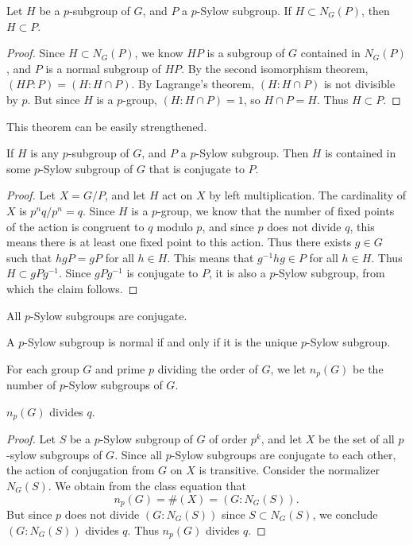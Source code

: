 \begin{lemma}
    Let $H$ be a $p$-subgroup of $G$, and $P$ a $p$-Sylow subgroup. If $H \subset N_G(P)$, then $H \subset P$.
\end{lemma}
\begin{proof}
    Since $H \subset N_G(P)$, we know $HP$ is a subgroup of $G$ contained in $N_G(P)$, and $P$ is a normal subgroup of $HP$. By the second isomorphism theorem, $(HP:P) = (H: H \cap P)$. By Lagrange's theorem, $(H: H \cap P)$ is not divisible by $p$. But since $H$ is a $p$-group, $(H: H \cap P) = 1$, so $H \cap P = H$. Thus $H \subset P$.
\end{proof}

This theorem can be easily strengthened.

\begin{theorem}
    If $H$ is any $p$-subgroup of $G$, and $P$ a $p$-Sylow subgroup. Then $H$ is contained in some $p$-Sylow subgroup of $G$ that is conjugate to $P$.
\end{theorem}
\begin{proof}
    Let $X = G/P$, and let $H$ act on $X$ by left multiplication. The cardinality of $X$ is $p^n q / p^n = q$. Since $H$ is a $p$-group, we know that the number of fixed points of the action is congruent to $q$ modulo $p$, and since $p$ does not divide $q$, this means there is at least one fixed point to this action. Thus there exists $g \in G$ such that $hgP = gP$ for all $h \in H$. This means that $g^{-1}hg \in P$ for all $h \in H$. Thus $H \subset gPg^{-1}$. Since $gPg^{-1}$ is conjugate to $P$, it is also a $p$-Sylow subgroup, from which the claim follows.
\end{proof}

\begin{corollary}
    All $p$-Sylow subgroups are conjugate.
\end{corollary}

\begin{corollary}
    A $p$-Sylow subgroup is normal if and only if it is the unique $p$-Sylow subgroup.
\end{corollary}

For each group $G$ and prime $p$ dividing the order of $G$, we let $n_p(G)$ be the number of $p$-Sylow subgroups of $G$.

\begin{theorem}
    $n_p(G)$ divides $q$.
\end{theorem}
\begin{proof}
    Let $S$ be a $p$-Sylow subgroup of $G$ of order $p^k$, and let $X$ be the set of all $p$-sylow subgroups of $G$. Since all $p$-Sylow subgroups are conjugate to each other, the action of conjugation from $G$ on $X$ is transitive. Consider the normalizer $N_G(S)$. We obtain from the class equation that
    \[ n_p(G) = \#(X) = (G:N_G(S)). \]
    But since $p$ does not divide $(G:N_G(S))$ since $S \subset N_G(S)$, we conclude $(G:N_G(S))$ divides $q$. Thus $n_p(G)$ divides $q$.
\end{proof}

